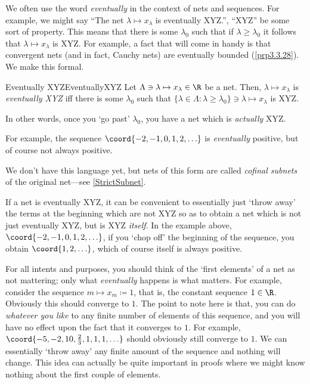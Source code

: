 We often use the word \emph{eventually} in the context of nets and sequences.  For example, we might say ``The net $\lambda \mapsto x_\lambda$ is eventually XYZ.'', ``XYZ'' be some sort of property.  This means that there is some $\lambda _0$ such that if $\lambda \geq \lambda _0$ it follows that $\lambda \mapsto x_\lambda$ is XYZ.  For example, a fact that will come in handy is that convergent nets (and in fact, Cauchy nets) are eventually bounded (\cref{prp3.3.28}).  We make this formal.
\begin{mdf}{Eventually XYZ}{EventuallyXYZ}
Let $\Lambda \ni \lambda \mapsto x_\lambda \in \R$ be a net.  Then, $\lambda \mapsto x_\lambda$ is \emph{eventually XYZ} iff there is some $\lambda _0$ such that $\{ \lambda \in \Lambda :\lambda \geq \lambda _0\} \ni \lambda \mapsto x_\lambda$ is XYZ.
\begin{rmk}
In other words, once you `go past' $\lambda _0$, you have a net which is \emph{actually} XYZ.
\end{rmk}
\begin{rmk}
For example, the sequence $\coord{-2,-1,0,1,2,\ldots }$ is \emph{eventually} positive, but of course not always positive.
\end{rmk}
\begin{rmk}
We don't have this language yet, but nets of this form are called \emph{cofinal subnets} of the original net---see \cref{StrictSubnet}.
\end{rmk}
\end{mdf}

If a net is eventually XYZ, it can be convenient to essentially just `throw away' the terms at the beginning which are not XYZ so as to obtain a net which is not just eventually XYZ, but is XYZ \emph{itself}.  In the example above, $\coord{-2,-1,0,1,2,\ldots}$, if you `chop off' the beginning of the sequence, you obtain $\coord{1,2,\ldots}$, which of course itself is always positive.

For all intents and purposes, you should think of the `first elements' of a net as not mattering; only what \emph{eventually} happens is what matters.  For example, consider the sequence $m\mapsto x_m\coloneqq 1$, that is, the constant sequence $1\in \R$.  Obviously this should converge to $1$.  The point to note here is that, you can do \emph{whatever you like} to any finite number of elements of this sequence, and you will have no effect upon the fact that it converges to $1$.  For example, $\coord{-5,-2,10,\frac{2}{3},1,1,1,\ldots}$ should obviously still converge to $1$.  We can essentially `throw away' any finite amount of the sequence and nothing will change.  This idea can actually be quite important in proofs where we might know nothing about the first couple of elements.

